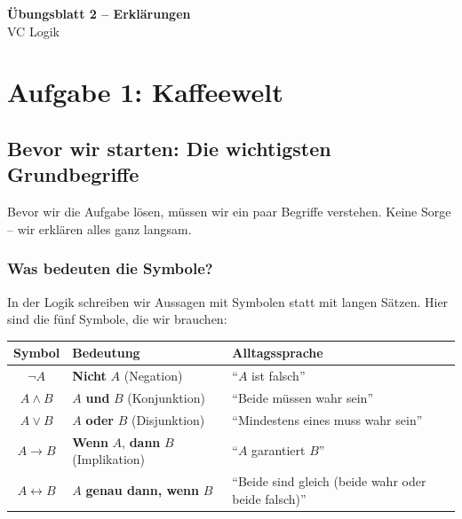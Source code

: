 \documentclass[a4paper,12pt]{article}
\begin{document}
\begin{center}
{\LARGE\bfseries \"Ubungsblatt 2 -- Erkl\"arungen}\\[0.5em]
{\large VC Logik}
\end{center}

\bigskip

\section{Aufgabe 1: Kaffeewelt}


\subsection{Bevor wir starten: Die wichtigsten Grundbegriffe}

Bevor wir die Aufgabe l\"osen, m\"ussen wir ein paar Begriffe verstehen.
Keine Sorge -- wir erkl\"aren alles ganz langsam.

\subsubsection*{Was bedeuten die Symbole?}

In der Logik schreiben wir Aussagen mit Symbolen statt mit langen S\"atzen.
Hier sind die f\"unf Symbole, die wir brauchen:

\begin{center}
\renewcommand{\arraystretch}{1.6}
\begin{tabular}{c|l|l}
\toprule
\textbf{Symbol} & \textbf{Bedeutung} & \textbf{Alltagssprache} \\
\midrule
$\neg A$ & \textbf{Nicht} $A$ (Negation)
  & "`$A$ ist falsch"' \\
$A \wedge B$ & $A$ \textbf{und} $B$ (Konjunktion)
  & "`Beide m\"ussen wahr sein"' \\
$A \vee B$ & $A$ \textbf{oder} $B$ (Disjunktion)
  & "`Mindestens eines muss wahr sein"' \\
$A \to B$ & \textbf{Wenn} $A$, \textbf{dann} $B$ (Implikation)
  & "`$A$ garantiert $B$"' \\
$A \leftrightarrow B$ & $A$ \textbf{genau dann, wenn} $B$
  & "`Beide sind gleich (beide wahr oder beide falsch)"' \\
\bottomrule
\end{tabular}
\end{center}
\end{document}
